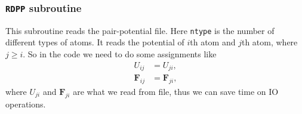 
\subsubsection{\texttt{RDPP} subroutine}

This subroutine reads the pair-potential file.
Here \texttt{ntype} is the number of different types of atoms.
It reads the potential of $i$th atom and $j$th atom, where $j \geq i$.
So in the code we need to do some assignments like
\begin{align}
	U_{ij}      & = U_{ji},      \\
	\bm{F}_{ij} & = \bm{F}_{ji},
\end{align}
where $U_{ji}$ and $\bm{F}_{ji}$ are what we read from file,
thus we can save time on IO operations.
